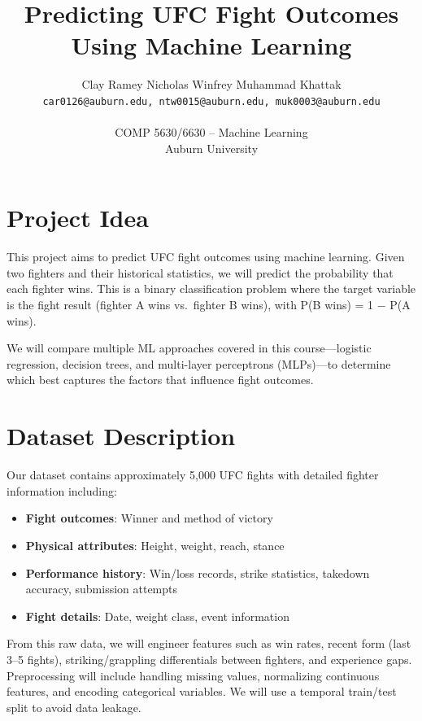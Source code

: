 \documentclass[10pt,twocolumn,letterpaper]{article}
\begin{document}
\title{Predicting UFC Fight Outcomes Using Machine Learning}

\author{
Clay Ramey \quad Nicholas Winfrey \quad Muhammad Khattak \\
{\tt\small car0126@auburn.edu, ntw0015@auburn.edu, muk0003@auburn.edu} \\
\\
COMP 5630/6630 -- Machine Learning \\
Auburn University
}

\maketitle
\thispagestyle{empty}

\section{Project Idea}
This project aims to predict UFC fight outcomes using machine learning. Given two fighters and their historical statistics, we will predict the probability that each fighter wins. This is a binary classification problem where the target variable is the fight result (fighter A wins vs.\ fighter B wins), with P(B wins) = 1 $-$ P(A wins).

We will compare multiple ML approaches covered in this course---logistic regression, decision trees, and multi-layer perceptrons (MLPs)---to determine which best captures the factors that influence fight outcomes.

\section{Dataset Description}
Our dataset contains approximately 5,000 UFC fights with detailed fighter information including:

\begin{itemize}
\item \textbf{Fight outcomes}: Winner and method of victory
\item \textbf{Physical attributes}: Height, weight, reach, stance
\item \textbf{Performance history}: Win/loss records, strike statistics, takedown accuracy, submission attempts
\item \textbf{Fight details}: Date, weight class, event information
\end{itemize}

From this raw data, we will engineer features such as win rates, recent form (last 3--5 fights), striking/grappling differentials between fighters, and experience gaps. Preprocessing will include handling missing values, normalizing continuous features, and encoding categorical variables. We will use a temporal train/test split to avoid data leakage.
\end{document}
